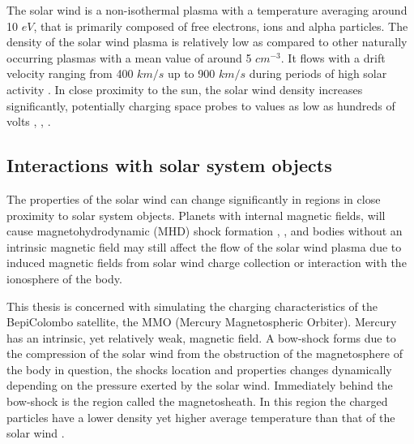 The solar wind is a non-isothermal plasma with a temperature averaging around 10 $eV$, that is primarily composed of free electrons, ions and alpha particles. The density of the solar wind plasma is relatively low as compared to other naturally occurring plasmas with a mean value of around 5 $cm^{-3}$. It flows with a drift velocity ranging from 400 $km/s$ up to 900 $km/s$ during periods of high solar activity \parencite{LAI2019}. In close proximity to the sun, the solar wind density increases significantly, potentially charging space probes to values as low as hundreds of volts \parencite{LAI2019}, \parencite{Deca2013}, \parencite{Garrett1981}.

\subsection*{Interactions with solar system objects}
The properties of the solar wind can change significantly in regions in close proximity to solar system objects. Planets with internal magnetic fields, will cause magnetohydrodynamic (MHD) shock formation \parencite{Luhmann2004}, \parencite{Benna2009}, and bodies without an intrinsic magnetic field may still affect the flow of the solar wind plasma due to induced magnetic fields from solar wind charge collection or interaction with the ionosphere of the body.


This thesis is concerned with simulating the charging characteristics of the BepiColombo satellite, the MMO (Mercury Magnetospheric Orbiter). Mercury has an intrinsic, yet relatively weak, magnetic field. A bow-shock forms due to the compression of the solar wind from the obstruction of the magnetosphere of the body in question, the shocks location and properties changes dynamically depending on the pressure exerted by the solar wind. Immediately behind the bow-shock is the region called the magnetosheath. In this region the charged particles have a lower density yet higher average temperature than that of the solar wind \parencite{Benna2009}. 

